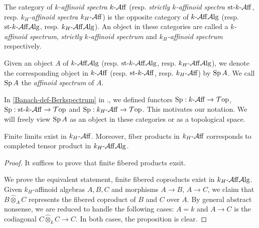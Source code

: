 \begin{definition}
    The category of \emph{$k$-affinoid spectra} $k\text{-}\mathcal{A}\mathrm{ff}$ (resp. \emph{strictly $k$-affinoid spectra} $\text{st-}k\text{-}\mathcal{A}\mathrm{ff}$, resp. \emph{$k_H$-affinoid spectra} $k_H\text{-}\mathcal{A}\mathrm{ff}$) is the opposite category of $k\text{-}\mathcal{A}\mathrm{ff}\mathcal{A}\mathrm{lg}$ (resp. $\text{st-}k\text{-}\mathcal{A}\mathrm{ff}\mathcal{A}\mathrm{lg}$, resp. $k_H\text{-}\mathcal{A}\mathrm{ff}\mathcal{A}\mathrm{lg}$). An object in these categories are called a \emph{$k$-affinoid spectrum}, \emph{strictly $k$-affinoid spectrum} and \emph{$k_H$-affinoid spectrum} respectively.

    Given an object $A$ of $k\text{-}\mathcal{A}\mathrm{ff}\mathcal{A}\mathrm{lg}$ (resp. $\text{st-}k\text{-}\mathcal{A}\mathrm{ff}\mathcal{A}\mathrm{lg}$, resp. $k_H\text{-}\mathcal{A}\mathrm{ff}\mathcal{A}\mathrm{lg}$), we denote the corresponding object in $k\text{-}\mathcal{A}\mathrm{ff}$ (resp. $\text{st-}k\text{-}\mathcal{A}\mathrm{ff}$, resp. $k_H\text{-}\mathcal{A}\mathrm{ff}$) by $\operatorname{Sp} A$. We call $\operatorname{Sp} A$ the \emph{affinoid spectrum} of $A$.
\end{definition}
In \cref{Banach-def-Berkspectrum} in ., we defined functors $\operatorname{Sp}:k\text{-}\mathcal{A}\mathrm{ff}\rightarrow \mathcal{T}\mathrm{op}$, $\operatorname{Sp}:\text{st-}k\text{-}\mathcal{A}\mathrm{ff}\rightarrow \mathcal{T}\mathrm{op}$ and $\operatorname{Sp}:k_H\text{-}\mathcal{A}\mathrm{ff}\rightarrow \mathcal{T}\mathrm{op}$. This motivates our notation. We will freely view $\operatorname{Sp} A$ as an object in these categories or as a topological space.

\begin{proposition}\label{prop-existfiberprod}
    Finite limits exist in $k_H\text{-}\mathcal{A}\mathrm{ff}$. Moreover, fiber products in $k_H\text{-}\mathcal{A}\mathrm{ff}$ corresponds to completed tensor product in $k_H\text{-}\mathcal{A}\mathrm{ff}\mathcal{A}\mathrm{lg}$.
\end{proposition}
\begin{proof}
    It suffices to prove that finite fibered products exsit.

    We prove the equivalent statement, finite fibered coproducts exist in $k_H\text{-}\mathcal{A}\mathrm{ff}\mathcal{A}\mathrm{lg}$. Given $k_H$-affinoid algebras $A,B,C$ and morphisms $A\rightarrow B$, $A\rightarrow C$, we claim that $B\hat{\otimes}_A C$ represents the fibered coproduct of $B$ and $C$ over $A$. 
    By general abstract nonsense, we are reduced to handle the following cases: $A=k$ and $A\rightarrow C$ is the codiagonal $C\hat{\otimes}_k C\rightarrow C$. In both cases, the proposition is clear.


\end{proof}




